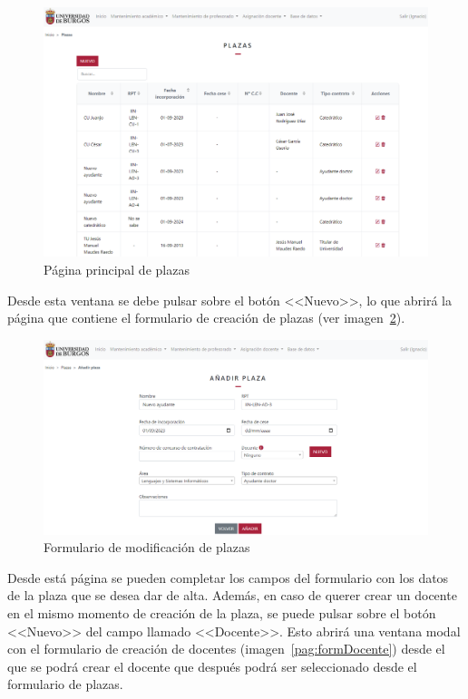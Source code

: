 \begin{figure}
	\centering
	\includegraphics[width=\textwidth]{../img/Anexos/Manual usuario/plazas.png}
	\caption{Página principal de plazas}\label{pag:plazas}
\end{figure}

Desde esta ventana se debe pulsar sobre el botón <<Nuevo>>, lo que abrirá la página que contiene el formulario de creación de plazas (ver imagen~\ref{pag:formPlaza}).

\begin{figure}
	\centering
	\includegraphics[width=\textwidth]{../img/Anexos/Manual usuario/formPlaza.png}
	\caption{Formulario de modificación de plazas}\label{pag:formPlaza}
\end{figure}

Desde está página se pueden completar los campos del formulario con los datos de la plaza que se desea dar de alta. 
Además, en caso de querer crear un docente en el mismo momento de creación de la plaza, se puede pulsar sobre el botón <<Nuevo>> del campo llamado <<Docente>>.
Esto abrirá una ventana modal con el formulario de creación de docentes (imagen~\ref{pag:formDocente}) desde el que se podrá crear el docente que después podrá ser seleccionado desde el formulario de plazas.

